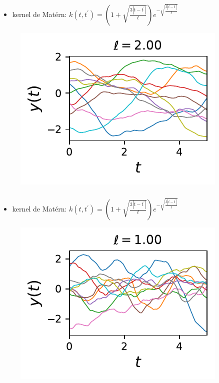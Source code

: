 \documentclass[xcolor=svgnames, t]{beamer}
\begin{document}
\begin{frame}
  \frametitle{\secname}
  \begin{itemize}
    \item kernel de Matérn:
    $k (t, t^\prime) = ( 1 + \sqrt{\frac{3 |t - t^\prime|}{\ell} } ) e^{-\sqrt{\frac{3 |t - t^\prime|}{\ell} }}$
  \end{itemize}
  \begin{figure}
    \includegraphics{10_gp_time_MaternKernel_2.00.pdf}
  \end{figure}
\end{frame}

\begin{frame}
  \frametitle{\secname}
  \begin{itemize}
    \item kernel de Matérn:
    $k (t, t^\prime) = ( 1 + \sqrt{\frac{3 |t - t^\prime|}{\ell} } ) e^{-\sqrt{\frac{3 |t - t^\prime|}{\ell} }}$
  \end{itemize}
  \begin{figure}
    \includegraphics{10_gp_time_MaternKernel_1.00.pdf}
  \end{figure}
\end{frame}
\end{document}
